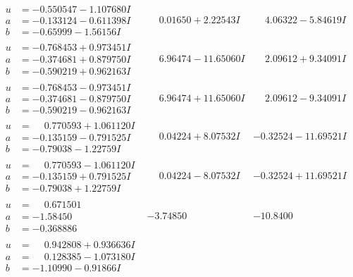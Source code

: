 \documentclass[1p]{elsarticle_modified}
\theoremstyle{definition}
\begin{document}
$$\begin{array}{c|c|c}
\begin{aligned}
u &= -0.550547 - 1.107680 I \\
a &= -0.133124 - 0.611398 I \\
b &= -0.65999 - 1.56156 I\end{aligned}
 & \phantom{-}0.01650 + 2.22543 I & \phantom{-}4.06322 - 5.84619 I \\ \hline\begin{aligned}
u &= -0.768453 + 0.973451 I \\
a &= -0.374681 + 0.879750 I \\
b &= -0.590219 + 0.962163 I\end{aligned}
 & \phantom{-}6.96474 - 11.65060 I & \phantom{-}2.09612 + 9.34091 I \\ \hline\begin{aligned}
u &= -0.768453 - 0.973451 I \\
a &= -0.374681 - 0.879750 I \\
b &= -0.590219 - 0.962163 I\end{aligned}
 & \phantom{-}6.96474 + 11.65060 I & \phantom{-}2.09612 - 9.34091 I \\ \hline\begin{aligned}
u &= \phantom{-}0.770593 + 1.061120 I \\
a &= -0.135159 - 0.791525 I \\
b &= -0.79038 - 1.22759 I\end{aligned}
 & \phantom{-}0.04224 + 8.07532 I & -0.32524 - 11.69521 I \\ \hline\begin{aligned}
u &= \phantom{-}0.770593 - 1.061120 I \\
a &= -0.135159 + 0.791525 I \\
b &= -0.79038 + 1.22759 I\end{aligned}
 & \phantom{-}0.04224 - 8.07532 I & -0.32524 + 11.69521 I \\ \hline\begin{aligned}
u &= \phantom{-}0.671501\phantom{ +0.000000I} \\
a &= -1.58450\phantom{ +0.000000I} \\
b &= -0.368886\phantom{ +0.000000I}\end{aligned}
 & -3.74850\phantom{ +0.000000I} & -10.8400\phantom{ +0.000000I} \\ \hline\begin{aligned}
u &= \phantom{-}0.942808 + 0.936636 I \\
a &= \phantom{-}0.128385 - 1.073180 I \\
b &= -1.10990 - 0.91866 I\end{aligned}

\end{array}$$
\end{document}
